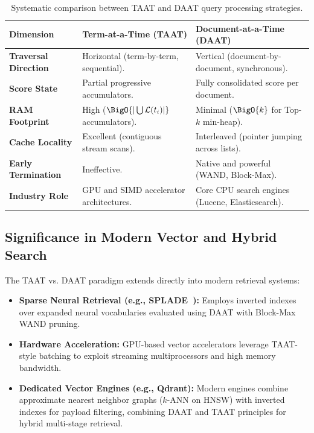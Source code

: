 \begin{table}[H]
\centering
\small
\begin{tabularx}{\linewidth}{l X X}
\toprule
\textbf{Dimension} & \textbf{Term-at-a-Time (TAAT)} & \textbf{Document-at-a-Time (DAAT)} \\
\midrule
\textbf{Traversal Direction} & Horizontal (term-by-term, sequential). & Vertical (document-by-document, synchronous). \\
\addlinespace
\textbf{Score State} & Partial progressive accumulators. & Fully consolidated score per document. \\
\addlinespace
\textbf{RAM Footprint} & High ($\BigO{|\bigcup \mathcal{L}(t_i)|}$ accumulators). & Minimal ($\BigO{k}$ for Top-$k$ min-heap). \\
\addlinespace
\textbf{Cache Locality} & Excellent (contiguous stream scans). & Interleaved (pointer jumping across lists). \\
\addlinespace
\textbf{Early Termination} & Ineffective. & Native and powerful (WAND, Block-Max). \\
\addlinespace
\textbf{Industry Role} & GPU and SIMD accelerator architectures. & Core CPU search engines (Lucene, Elasticsearch). \\
\bottomrule
\end{tabularx}
\caption{Systematic comparison between TAAT and DAAT query processing strategies.}
\label{tab:taat-vs-daat-summary-en}
\end{table}

\subsection{Significance in Modern Vector and Hybrid Search}
The TAAT vs. DAAT paradigm extends directly into modern retrieval systems:
\begin{itemize}
    \item \textbf{Sparse Neural Retrieval (e.g., SPLADE~\cite{formal2021}):} Employs inverted indexes over expanded neural vocabularies evaluated using DAAT with Block-Max WAND pruning.
    \item \textbf{Hardware Acceleration:} GPU-based vector accelerators leverage TAAT-style batching to exploit streaming multiprocessors and high memory bandwidth.
    \item \textbf{Dedicated Vector Engines (e.g., Qdrant):} Modern engines combine approximate nearest neighbor graphs ($k$-ANN on HNSW) with inverted indexes for payload filtering, combining DAAT and TAAT principles for hybrid multi-stage retrieval.
\end{itemize}
